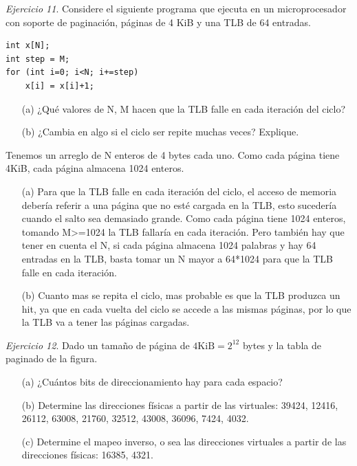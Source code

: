 \documentclass[12pt]{article}
\begin{document}
\noindent \textit{Ejercicio 11}. Considere el siguiente programa que ejecuta en un microprocesador con soporte de paginación, páginas de 4 KiB y una TLB de 64 entradas.
\begin{lstlisting}[style=CStyle]
int x[N];
int step = M;
for (int i=0; i<N; i+=step)
    x[i] = x[i]+1;
\end{lstlisting}

\begin{itemize}
    \item[(a)] ¿Qué valores de N, M hacen que la TLB falle en cada iteración del ciclo?
    \item[(b)] ¿Cambia en algo si el ciclo ser repite muchas veces? Explique.
\end{itemize}

\begin{rta}
    Tenemos un arreglo de N enteros de 4 bytes cada uno. Como cada página tiene 4KiB, cada página almacena 1024 enteros. 
    \begin{itemize}
        \item[(a)] Para que la TLB falle en cada iteración del ciclo, el acceso de memoria debería referir a una página que no esté cargada en la TLB, esto sucedería cuando el salto sea demasiado grande. Como cada página tiene 1024 enteros, tomando M>=1024 la TLB fallaría en cada iteración. Pero también hay que tener en cuenta el N, si cada página almacena 1024 palabras y hay 64 entradas en la TLB, basta tomar un N mayor a 64*1024 para que la TLB falle en cada iteración.
        \item[(b)] Cuanto mas se repita el ciclo, mas probable es que la TLB produzca un hit, ya que en cada vuelta del ciclo se accede a las mismas páginas, por lo que la TLB va a tener las páginas cargadas.
    \end{itemize}
\end{rta}

\newpage
\noindent \textit{Ejercicio 12}. Dado un tamaño de página de $4 \mathrm{KiB}=2^{12}$ bytes y la tabla de paginado de la figura.
\begin{itemize}
    \item[(a)] ¿Cuántos bits de direccionamiento hay para cada espacio?
    \item[(b)] Determine las direcciones físicas a partir de las virtuales: 39424, 12416, 26112, 63008, 21760, 32512, 43008, 36096, 7424, 4032.
    \item[(c)] Determine el mapeo inverso, o sea las direcciones virtuales a partir de las direcciones físicas: 16385, 4321.
\end{itemize}
\end{document}
